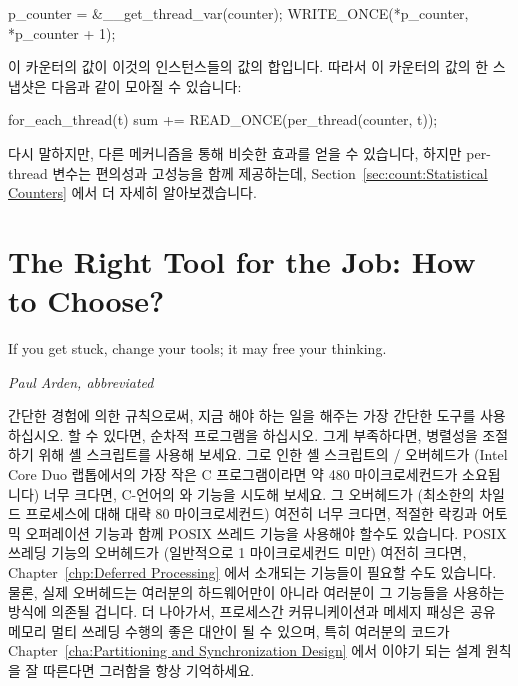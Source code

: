 \begin{VerbatimU}
p_counter = &__get_thread_var(counter);
WRITE_ONCE(*p_counter, *p_counter + 1);
\end{VerbatimU}

이 카운터의 값이 이것의 인스턴스들의 값의 합입니다.
따라서 이 카운터의 값의 한 스냅샷은 다음과 같이 모아질 수 있습니다:

\begin{VerbatimU}
for_each_thread(t)
  sum += READ_ONCE(per_thread(counter, t));
\end{VerbatimU}

다시 말하지만, 다른 메커니즘을 통해 비슷한 효과를 얻을 수 있습니다, 하지만
per-thread 변수는 편의성과 고성능을 함께 제공하는데,
Section~\ref{sec:count:Statistical Counters} 에서 더 자세히 알아보겠습니다.

\section{The Right Tool for the Job: How to Choose?}
\label{sec:toolsoftrade:The Right Tool for the Job: How to Choose?}
%
\epigraph{If you get stuck, change your tools; it may free your thinking.}
	 {\emph{Paul Arden, abbreviated}}

간단한 경험에 의한 규칙으로써, 지금 해야 하는 일을 해주는 가장 간단한 도구를
사용하십시오.
할 수 있다면, 순차적 프로그램을 하십시오.
그게 부족하다면, 병렬성을 조절하기 위해 셸 스크립트를 사용해 보세요.
그로 인한 셸 스크립트의 / 오버헤드가 (Intel Core Duo
랩톱에서의 가장 작은 C 프로그램이라면 약 480 마이크로세컨드가 소요됩니다)
너무 크다면, C-언어의  와  기능을 시도해 보세요.
그 오버헤드가 (최소한의 차일드 프로세스에 대해 대략 80 마이크로세컨드) 여전히
너무 크다면, 적절한 락킹과 어토믹 오퍼레이션 기능과 함께 POSIX 쓰레드 기능을
사용해야 할수도 있습니다.
POSIX 쓰레딩 기능의 오버헤드가 (일반적으로 1 마이크로세컨드 미만) 여전히
크다면, Chapter~\ref{chp:Deferred Processing} 에서 소개되는 기능들이 필요할
수도 있습니다.
물론, 실제 오버헤드는 여러분의 하드웨어만이 아니라 여러분이 그 기능들을
사용하는 방식에 의존될 겁니다.
더 나아가서, 프로세스간 커뮤니케이션과 메세지 패싱은 공유 메모리 멀티 쓰레딩
수행의 좋은 대안이 될 수 있으며, 특히 여러분의 코드가
Chapter~\ref{cha:Partitioning and Synchronization Design}
에서 이야기 되는 설계 원칙을 잘 따른다면 그러함을 항상 기억하세요.

